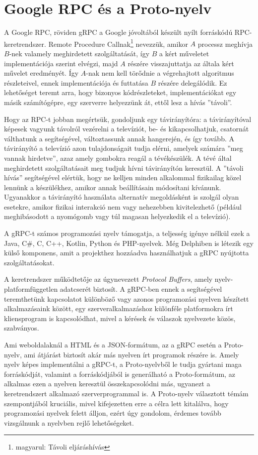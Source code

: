 \documentclass[tocnopagenum]{thesis-ekf}
\theoremstyle{definition}
\theoremstyle{remark}
\begin{document}
	\section{Google RPC és a Proto-nyelv}
	\label{grpc}
	A Google RPC, röviden gRPC a Google jóvoltából készült nyílt forráskódú RPC-keretrendszer. Remote Procedure Callnak\footnote{magyarul: Távoli eljáráshívás} nevezzük, amikor $A$ processz meghívja $B$-nek valamely meghirdetett szolgáltatását, így $B$ a kért műveletet implementációja szerint elvégzi, majd $A$ részére visszajuttatja az általa kért művelet eredményét. Így $A$-nak nem kell törődnie a végrehajtott algoritmus részleteivel, ennek implementációja és futtatása $B$ részére delegálódik. Ez lehetőséget teremt arra, hogy bizonyos kódrészleteket, implementációkat egy másik számítógépre, egy szerverre helyezzünk át, ettől lesz a hívás ''távoli''.

	Hogy az RPC-t jobban megértsük, gondoljunk egy távirányítóra: a távirányítóval képesek vagyunk távolról vezérelni a televíziót, be- és kikapcsolhatjuk, csatornát válthatunk a segítségével, változtassunk annak hangerején, és így tovább. A távirányító a televízió azon tulajdonságait tudja elérni, amelyek számára ''meg vannak hirdetve'', azaz amely gombokra reagál a tévékészülék. A tévé által meghirdetett szolgáltatásait meg tudjuk hívni távirányítón keresztül. A ''távoli hívás'' segítségével elértük, hogy ne kelljen minden alkalommal fizikailag közel lennünk a készülékhez, amikor annak beállításain módosítani kívánunk. Ugyanakkor a távirányító használata alternatív megoldásként is szolgál olyan esetekre, amikor fizikai interakció nem vagy nehezebben kivitelezhető (például meghibásodott a nyomógomb vagy túl magasan helyezkedik el a televízió).
	
	A gRPC-t számos programozási nyelv támogatja, a teljesség igénye nélkül ezek a Java, C\#, C, C++, Kotlin, Python és PHP-nyelvek. Még Delphiben is létezik egy külső komponens, amit a projekthez hozzáadva használhatjuk a gRPC nyújtotta szolgáltatásokat. \cite{grpc_delphi}

	A keretrendszer működtetője az úgynevezett \textit{Protocol Buffers}, amely nyelv- platformfüggetlen adatcserét biztosít. A gRPC-ben ennek a segítségével teremthetünk kapcsolatot különböző vagy azonos programozási nyelven készített alkalmazásaink között, egy szerveralkalmazáshoz különféle platformokra írt kliensprogram is kapcsolódhat, mivel a kérések és válaszok nyelvezete közös, szabványos. 
	
	Ami weboldalaknál a HTML és a JSON-formátum, az a gRPC esetén a Proto-nyelv, ami átjárást biztosít akár más nyelven írt programok részére is. Amely nyelv képes implementálni a gRPC-t, a Proto-nyelvből le tudja gyártani maga forráskódját, valamint a forráskódjából is generálható a Proto-formátum, az alkalmas ezen a nyelven keresztül összekapcsolódni más, ugyanezt a keretrendszert alkalmazó szerverprogrammal is. A Proto-nyelv választott témám szempontjából kruciális, mivel kifejezetten erre a célra lett kitalálva, hogy programozási nyelvek felett álljon, ezért úgy gondolom, érdemes tovább vizsgálnunk a nyelvben rejlő lehetőségeket.
\end{document}
